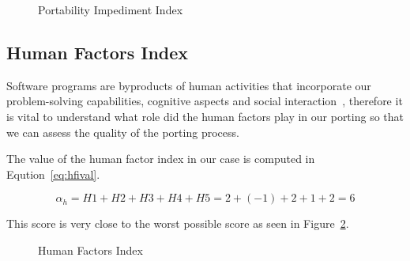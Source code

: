 \begin{figure}
    \begin{center}
    \end{center}

    \caption{Portability Impediment Index}
    \label{fig:pii}
\end{figure}


\subsection{Human Factors Index}

Software programs are byproducts of human activities that incorporate our
problem-solving capabilities, cognitive aspects and social
interaction~\cite{capretz}, therefore it is vital to understand what role did the
human factors play in our porting so that we can assess the quality of the
porting process. 

The value of the human factor index in our case is computed in
Eqution~\ref{eq:hfival}.

\begin{equation} \label{eq:hfival}
\alpha_h = H1 + H2 + H3 + H4 + H5 = 2 + (-1) + 2 + 1 + 2 = 6
\end{equation}

This score is very close to the worst possible score as seen in
Figure~\ref{fig:hfi}.

\begin{figure}[H]
    \begin{center}
    \end{center}

    \caption{Human Factors Index}
    \label{fig:hfi}
\end{figure}


